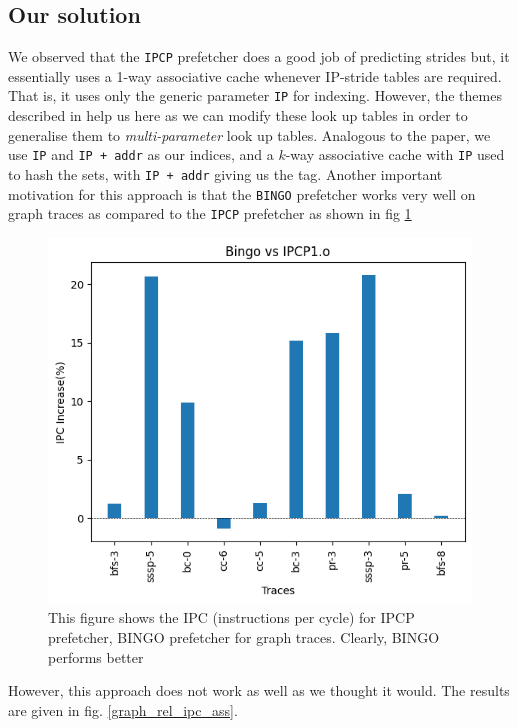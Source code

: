\documentclass[conference]{IEEEtran}
\begin{document}
\subsection{Our solution}
We observed that the \verb|IPCP| prefetcher does a good job of predicting strides but, it essentially uses a 1-way associative cache whenever IP-stride tables are required. That is, it uses only the generic parameter \verb|IP| for indexing. However, the themes described in \cite{b2} help us here as we can modify these look up tables in order to generalise them to \textit{multi-parameter} look up tables. Analogous to the paper, we use \verb|IP| and \verb|IP + addr| as our indices, and a $k$-way associative cache with \verb|IP| used to hash the sets, with \verb|IP + addr| giving us the tag. Another important motivation for this approach is that the \verb|BINGO| prefetcher \cite{b2} works very well on graph traces as compared to the \verb|IPCP| prefetcher as shown in fig \ref{graph_rel_bingo}
\begin{figure}
\includegraphics[scale=0.5]{Images/Bingo/bingovsipcp1.o.png}
\caption{This figure shows the IPC (instructions per cycle) for IPCP prefetcher, BINGO prefetcher for graph traces. Clearly, BINGO performs better}
\label{graph_rel_bingo}
\end{figure}
However, this approach does not work as well as we thought it would. The results are given in fig. \ref{graph_rel_ipc_ass}.
\end{document}
